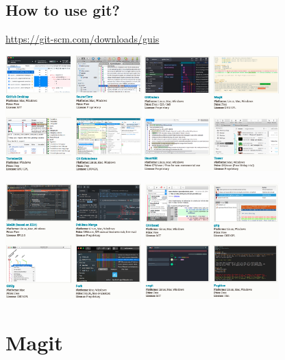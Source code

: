 \documentclass[11pt]{article}
\begin{document}
\newpage
\subsection{How to use git?}
\label{sec:orge30e6c6}


\url{https://git-scm.com/downloads/guis}

\begin{center}
\includegraphics[height=12em]{./s1.png}
\includegraphics[height=12em]{./s2.png}

\includegraphics[height=12em]{./s3.png}
\includegraphics[height=12em]{./s4.png}
\end{center}

\section{Magit}
\label{sec:org650610a}
\end{document}
